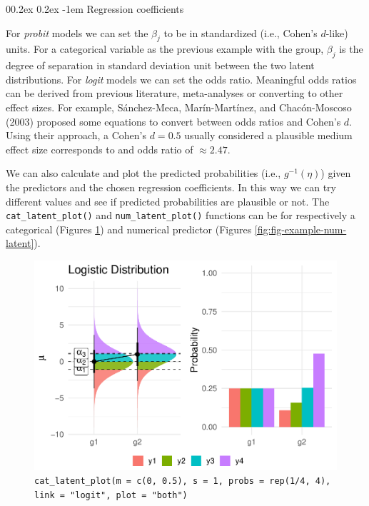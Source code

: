 \documentclass[
  man,floatsintext]{apa6}
\makeatletter
\let\oldparagraph\paragraph
\renewcommand{\paragraph}[1]{\oldparagraph{#1}\mbox{}}
\renewcommand{\paragraph}{\@startsection{paragraph}{4}{\parindent}%
  {0\baselineskip \@plus 0.2ex \@minus 0.2ex}%
  {-1em}%
  {\normalfont\normalsize\bfseries\itshape\typesectitle}}
\makeatother
\begin{document}
\paragraph{Regression coefficients}\label{regression-coefficients}

For \emph{probit} models we can set the \(\beta_j\) to be in standardized (i.e., Cohen's \(d\)-like) units. For a categorical variable as the previous example with the group, \(\beta_j\) is the degree of separation in standard deviation unit between the two latent distributions. For \emph{logit} models we can set the odds ratio. Meaningful odds ratios can be derived from previous literature, meta-analyses or converting to other effect sizes. For example, Sánchez-Meca, Marín-Martínez, and Chacón-Moscoso (2003) proposed some equations to convert between odds ratios and Cohen's \(d\). Using their approach, a Cohen's \(d = 0.5\) usually considered a plausible medium effect size corresponds to and odds ratio of \(\approx 2.47\).

We can also calculate and plot the predicted probabilities (i.e., \(g^{-1}(\eta)\)) given the predictors and the chosen regression coefficients. In this way we can try different values and see if predicted probabilities are plausible or not. The \texttt{cat\_latent\_plot()} and \texttt{num\_latent\_plot()} functions can be for respectively a categorical (Figures \ref{fig:fig-example-cat-latent}) and numerical predictor (Figures \ref{fig:fig-example-num-latent}).

\scriptsize

\begin{figure}

{\centering \includegraphics{paper_files/figure-latex/fig-example-cat-latent-1} 

}

\caption{\texttt{cat\_latent\_plot(m\ =\ c(0,\ 0.5),\ s\ =\ 1,\ probs\ =\ rep(1/4,\ 4),\ link\ =\ "logit",\ plot\ =\ "both")}}\label{fig:fig-example-cat-latent}
\end{figure}
\end{document}
